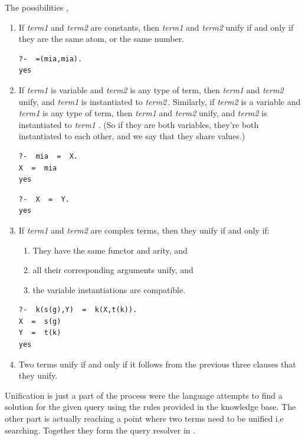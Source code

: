 \documentclass[thesis-solanki.tex]{subfiles}
\providecommand\metaSyntacticVariable[1]{\textsl{\ttfamily #1}}
\providecommand\mSV{\metaSyntacticVariable}
\begin{document}
The possibilities ,
\begin{enumerate}
\item If \mSV{term1} and \mSV{term2} are constants, then \mSV{term1} and \mSV{term2} unify if and only if they
  are the same atom, or the same number.
\begin{verbatim}
?-  =(mia,mia).
yes
\end{verbatim}

\item If \mSV{term1} is  variable and \mSV{term2} is any type of term, then \mSV{term1}
  and \mSV{term2} unify, and \mSV{term1} is instantiated to \mSV{term2}\,.
  Similarly, if \mSV{term2} is a variable and \mSV{term1} is any type of term, then \mSV{term1} and \mSV{term2}
  unify, and \mSV{term2} is instantiated to \mSV{term1} . (So if they are both 
variables, they’re both instantiated to each other, and we say that they share values.)
\begin{verbatim}
?-  mia  =  X.
X  =  mia
yes
\end{verbatim}

\begin{verbatim}
?-  X  =  Y.
yes
\end{verbatim}

\item If \mSV{term1} and \mSV{term2} are complex terms, then they unify if and only if:

\begin{enumerate}
\item They have the same functor and arity, and

\item all their corresponding arguments unify, and

\item the variable instantiations are compatible.
\end{enumerate}
\begin{verbatim}
?-  k(s(g),Y)  =  k(X,t(k)).
X  =  s(g)
Y  =  t(k)
yes
\end{verbatim}


\item Two terms unify if and only if it follows from the previous three clauses that they unify.
\end{enumerate}

Unification is just a part of the process were the language attempts to find a solution for the given query using the rules provided in the
knowledge base. The other part is actually reaching a point where two terms need to be unified i.e searching. Together they form the query
resolver in .
\end{document}
